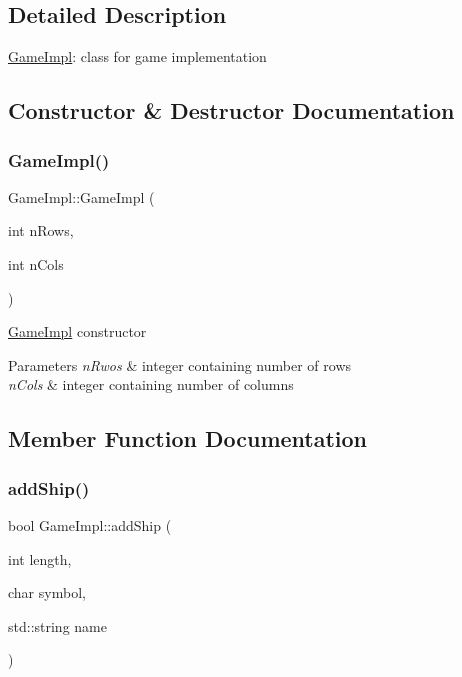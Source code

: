\subsection{Detailed Description}
\mbox{\hyperlink{class_game_impl}{Game\+Impl}}\+: class for game implementation 

\subsection{Constructor \& Destructor Documentation}
\mbox{\label{class_game_impl_a1ec88dfb57e180ee008cff4cf10934bf}} 
\subsubsection{\texorpdfstring{Game\+Impl()}{GameImpl()}}
{\footnotesize\ttfamily Game\+Impl\+::\+Game\+Impl (\begin{DoxyParamCaption}\item[{int}]{n\+Rows,  }\item[{int}]{n\+Cols }\end{DoxyParamCaption})}

\mbox{\hyperlink{class_game_impl}{Game\+Impl}} constructor 
\begin{DoxyParams}{Parameters}
{\em n\+Rwos} & integer containing number of rows \\
\hline
{\em n\+Cols} & integer containing number of columns \\
\hline
\end{DoxyParams}


\subsection{Member Function Documentation}
\mbox{\label{class_game_impl_a181c0a610e9d11739dd1a96a73703103}} 
\subsubsection{\texorpdfstring{add\+Ship()}{addShip()}}
{\footnotesize\ttfamily bool Game\+Impl\+::add\+Ship (\begin{DoxyParamCaption}\item[{int}]{length,  }\item[{char}]{symbol,  }\item[{std\+::string}]{name }\end{DoxyParamCaption})}

